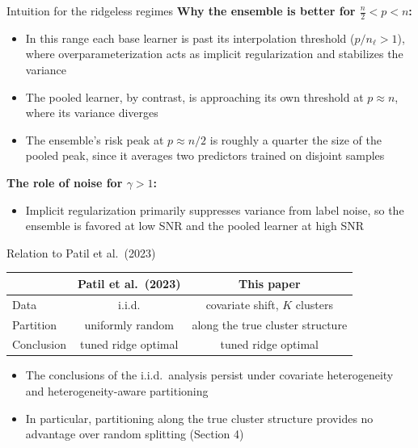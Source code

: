 \documentclass[aspectratio=169,11pt]{beamer}
\begin{document}
\begin{frame}{Intuition for the ridgeless regimes}
  \textbf{Why the ensemble is better for $\tfrac{n}{2} < p < n$:}
  \begin{itemize}
    \item In this range each base learner is past its interpolation threshold ($p/n_\ell > 1$), where overparameterization acts as implicit regularization and stabilizes the variance
    \item The pooled learner, by contrast, is approaching its own threshold at $p \approx n$, where its variance diverges
    \item The ensemble's risk peak at $p \approx n/2$ is roughly a quarter the size of the pooled peak, since it averages two predictors trained on disjoint samples
  \end{itemize}
  \vspace{1mm}
  \textbf{The role of noise for $\gamma > 1$:}
  \begin{itemize}
    \item Implicit regularization primarily suppresses variance from label noise, so the ensemble is favored at low SNR and the pooled learner at high SNR
  \end{itemize}
\end{frame}

\begin{frame}{Relation to Patil et al.\ (2023)}
  \begin{center}
  \renewcommand{\arraystretch}{1.3}
  \begin{tabular}{lcc}
     & \textcolor{softgray}{Patil et al.\ (2023)} & \textbf{This paper}\\
    \hline
    Data & i.i.d. & covariate shift, $K$ clusters\\
    Partition & uniformly random & along the true cluster structure\\
    Conclusion & tuned ridge optimal & tuned ridge optimal\\
  \end{tabular}
  \end{center}
  \vspace{3mm}
  \begin{itemize}
    \item The conclusions of the i.i.d.\ analysis persist under covariate heterogeneity and heterogeneity-aware partitioning
    \item In particular, partitioning along the true cluster structure provides no advantage over random splitting (Section 4)
  \end{itemize}
\end{frame}
\end{document}
